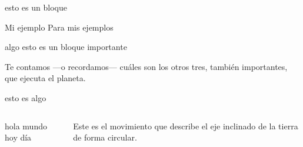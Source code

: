 \documentclass[utf8,spanish, xcolor={x11names,table},14pt, handout]{beamer}
\begin{document}
\begin{frame}\transsplithorizontalin
  \begin{block}{}
    esto es un bloque
  \end{block}
  
  \begin{exampleblock}{Mi ejemplo}
    Para mis ejemplos
  \end{exampleblock}
  
  \begin{alertblock}{algo}
    esto es un bloque importante
  \end{alertblock}
  Te contamos —o recordamos— cuáles son los otros tres, también importantes, que ejecuta el planeta.
\end{frame}

\begin{frame}\transsplithorizontalin
  \begin{example}
    esto es algo
  \end{example}
\end{frame}

\begin{frame}\transboxin
\begin{columns}[T]
\begin{column}{5cm}
  hola mundo hoy día
\end{column}
\begin{column}{5cm}
  Este es el movimiento que describe el eje inclinado de la tierra de forma circular.
\end{column}
\end{columns}
\end{frame}
\end{document}
